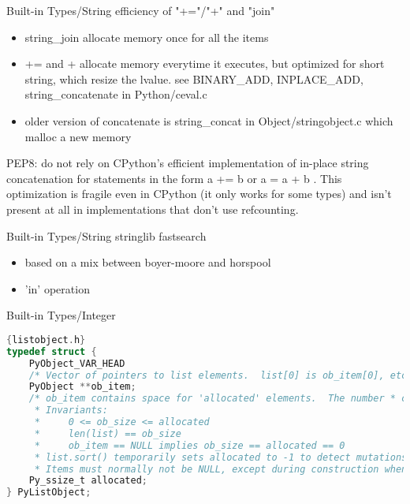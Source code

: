 \documentclass[xcolor=svgnames]{beamer}
\begin{document}
\begin{frame}{Built-in Types/String}
efficiency of "+="/"+" and "join"
\begin{itemize}
    \item string\_join allocate memory once for all the items
    \item += and + allocate memory everytime it executes, but optimized for short string, which resize the lvalue. see BINARY\_ADD, INPLACE\_ADD, string\_concatenate in Python/ceval.c
    \item older version of concatenate is string\_concat in Object/stringobject.c which malloc a new memory
\end{itemize}
PEP8: do not rely on CPython's efficient implementation of in-place string concatenation for statements in the form a += b or a = a + b . This optimization is fragile even in CPython (it only works for some types) and isn't present at all in implementations that don't use refcounting. 
\end{frame}

\begin{frame}{Built-in Types/String}
stringlib fastsearch 
\begin{itemize}
    \item based on a mix between boyer-moore and horspool
    \item 'in' operation
\end{itemize}
\end{frame}

\begin{frame}[fragile]{Built-in Types/Integer}
\begin{lstlisting}[language=C]{listobject.h}
typedef struct {
    PyObject_VAR_HEAD
    /* Vector of pointers to list elements.  list[0] is ob_item[0], etc. */
    PyObject **ob_item;
    /* ob_item contains space for 'allocated' elements.  The number * currently in use is ob_size.
     * Invariants:
     *     0 <= ob_size <= allocated
     *     len(list) == ob_size
     *     ob_item == NULL implies ob_size == allocated == 0
     * list.sort() temporarily sets allocated to -1 to detect mutations.
     * Items must normally not be NULL, except during construction when * the list is not yet visible outside the function that builds it.  */
    Py_ssize_t allocated;
} PyListObject;
\end{lstlisting} 
\end{frame}
\end{document}
